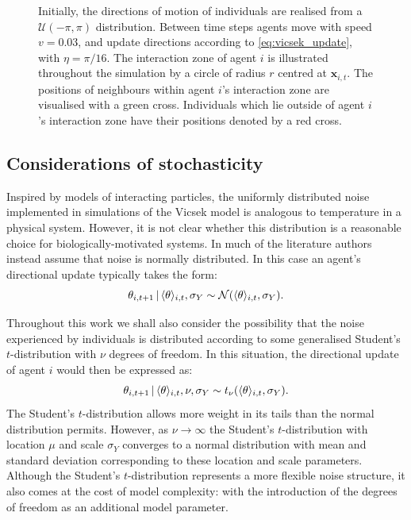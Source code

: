 \begin{figure}[tb]
{        Initially, the directions of motion of individuals are realised from a
        $\mathcal{U}(-\pi, \pi)$ distribution. Between time steps agents move with speed
        $v=0.03$, and update directions according to \cref{eq:vicsek_update}, with
        $\eta=\pi/16$. The interaction zone of agent $i$ is illustrated throughout the
        simulation by a circle of radius $r$ centred at $\bm{x}_{i,t}$. The positions of
        neighbours within agent $i$'s interaction zone are visualised with a green cross.
        Individuals which lie outside of agent $i$'s interaction zone have their positions
        denoted by a red cross.}
\end{figure}

\subsection{Considerations of stochasticity}

Inspired by models of interacting particles, the uniformly distributed noise implemented in
simulations of the Vicsek model is analogous to temperature in a physical system. However,
it is not clear whether this distribution is a reasonable choice for biologically-motivated
systems. In much of the literature authors instead assume that noise is normally
distributed. In this case an agent's directional update typically takes the form:
\begin{equation*}
    \theta_{i,t+1} \,|\, \langle\theta\rangle_{i,t}, \sigma_Y \sim
        \mathcal{N}(\langle\theta\rangle_{i,t}, \sigma_Y).
\end{equation*}

Throughout this work we shall also consider the possibility that the noise experienced by
individuals is distributed according to some generalised Student's $t$-distribution with
$\nu$ degrees of freedom. In this situation, the directional update of agent $i$ would
then be expressed as:
\begin{equation*}
    \theta_{i,t+1} \,|\, \langle\theta\rangle_{i,t}, \nu, \sigma_Y \sim
    t_{\nu}(\langle\theta\rangle_{i,t}, \sigma_Y).
\end{equation*}
The Student's $t$-distribution allows more weight in its tails than the normal
distribution permits. However, as $\nu\rightarrow\infty$ the Student's $t$-distribution
with location $\mu$ and scale $\sigma_Y$ converges to a normal distribution with mean and
standard deviation corresponding to these location and scale parameters.  Although the
Student's $t$-distribution represents a more flexible noise structure, it also comes at
the cost of model complexity: with the introduction of the degrees of freedom as an
additional model parameter.

